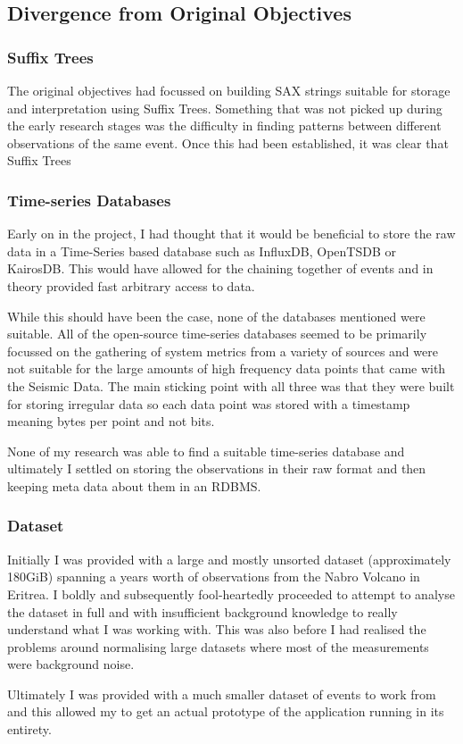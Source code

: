 \documentclass[../report.tex]{subfiles}
\begin{document}
\subsection{Divergence from Original Objectives} \label{sec:alteration-objectives}
\subsubsection{Suffix Trees}
	The original objectives had focussed on building SAX strings suitable for storage and interpretation using Suffix Trees.  Something that was not picked up during the early research stages was the difficulty in finding patterns between different observations of the same event.  Once this had been established, it was clear that Suffix Trees 

\subsubsection{Time-series Databases}
	Early on in the project, I had thought that it would be beneficial to store the raw data in a Time-Series based database such as InfluxDB, OpenTSDB or KairosDB.  This would have allowed for the chaining together of events and in theory provided fast arbitrary access to data.
	
	While this should have been the case, none of the databases mentioned were suitable.  All of the open-source time-series databases seemed to be primarily focussed on the gathering of system metrics from a variety of sources and were not suitable for the large amounts of high frequency data points that came with the Seismic Data.  The main sticking point with all three was that they were built for storing irregular data so each data point was stored with a timestamp meaning bytes per point and not bits.
	
	None of my research was able to find a suitable time-series database and ultimately I settled on storing the observations in their raw format and then keeping meta data about them in an RDBMS.
	
\subsubsection{Dataset}
	Initially I was provided with a large and mostly unsorted dataset (approximately 180GiB) spanning a years worth of observations from the Nabro Volcano in Eritrea.  I boldly and subsequently fool-heartedly proceeded to attempt to analyse the dataset in full and with insufficient background knowledge to really understand what I was working with.  This was also before I had realised the problems around normalising large datasets where most of the measurements were background noise.
	
	Ultimately I was provided with a much smaller dataset of events to work from and this allowed my to get an actual prototype of the application running in its entirety.
	
\end{document}
